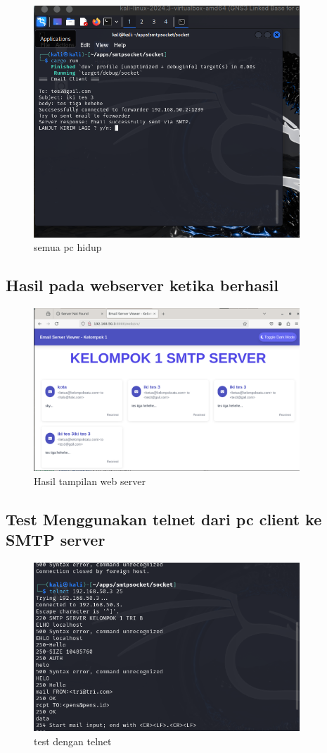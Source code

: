 \documentclass[12pt, a4paper]{article}
\begin{document}
\begin{enumerate}
 \begin{figure}[h]
    \centering
    \includegraphics[width=10cm]{bab 3/tes3.png}
    \caption{semua pc hidup}
  \end{figure}
  \end{enumerate}
\subsection{Hasil pada webserver ketika berhasil}
 \begin{figure}[h]
    \centering
    \includegraphics[width=10cm]{bab 3/tes4.png}
    \caption{Hasil tampilan web server}
  \end{figure}
\clearpage
\subsection{Test Menggunakan telnet dari pc client ke SMTP server}
 \begin{figure}[h]
    \centering
    \includegraphics[width=10cm]{bab 3/tes5.png}
    \caption{test dengan telnet}
  \end{figure}
\end{document}
